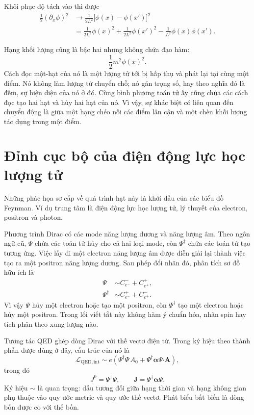 Khôi phục độ tách vào thì được
\begin{align}
\frac12(\partial_x\phi)^2
&\longrightarrow
\frac{1}{2L^2}\bigl[\phi(x)-\phi(x')\bigr]^2
\\
&=
\frac{1}{2L^2}\phi(x)^2
+\frac{1}{2L^2}\phi(x')^2
-\frac{1}{L^2}\phi(x)\phi(x').
\end{align}

Hạng khối lượng cũng là bậc hai nhưng không chứa đạo hàm:
\begin{equation}
\frac12m^2\phi(x)^2.
\end{equation}
Cách đọc một-hạt của nó là một lượng tử tới bị hấp thụ và phát lại tại cùng một điểm. Nó không làm lượng tử chuyển chỗ; nó gán trọng số, hay theo nghĩa đó là đếm, sự hiện diện của nó ở đó. Cùng bình phương toán tử ấy cũng chứa các cách đọc tạo hai hạt và hủy hai hạt của nó. Vì vậy, sự khác biệt có liên quan đến chuyển động là giữa một hạng chéo nối các điểm lân cận và một chèn khối lượng tác dụng trong một điểm.

\section{Đỉnh cục bộ của điện động lực học lượng tử}

Những phác họa sơ cấp về quá trình hạt này là khởi đầu của các biểu đồ Feynman. Ví dụ trung tâm là điện động lực học lượng tử, lý thuyết của electron, positron và photon.

Phương trình Dirac có các mode năng lượng dương và năng lượng âm. Theo ngôn ngữ cũ, \(\Psi\) chứa các toán tử hủy cho cả hai loại mode, còn \(\Psi^\dagger\) chứa các toán tử tạo tương ứng. Việc lấy đi một electron năng lượng âm được diễn giải lại thành việc tạo ra một positron năng lượng dương. Sau phép đổi nhãn đó, phân tích sơ đồ hữu ích là
\begin{align}
\Psi
&\sim
C^-_{e^-}+C^+_{e^+},
\\
\Psi^\dagger
&\sim
C^+_{e^-}+C^-_{e^+}.
\end{align}
Vì vậy \(\Psi\) hủy một electron hoặc tạo một positron, còn \(\Psi^\dagger\) tạo một electron hoặc hủy một positron. Trong lối viết tắt này không hàm ý chuẩn hóa, nhãn spin hay tích phân theo xung lượng nào.

Tương tác QED ghép dòng Dirac với thế vectơ điện từ. Trong ký hiệu theo thành phần được dùng ở đây, cấu trúc của nó là
\begin{equation}
\mathcal L_{\mathrm{QED,int}}
\sim
e\left(
\Psi^\dagger\Psi\,A_0
+
\Psi^\dagger\boldsymbol{\alpha}\Psi\mathbin{\boldsymbol{\cdot}}\mathbf A
\right),
\end{equation}
trong đó
\begin{equation}
J^0=\Psi^\dagger\Psi,
\qquad
\mathbf J=\Psi^\dagger\boldsymbol{\alpha}\Psi.
\end{equation}
Ký hiệu \(\sim\) là quan trọng: dấu tương đối giữa hạng thời gian và hạng không gian phụ thuộc vào quy ước metric và quy ước thế vectơ. Phát biểu bất biến là dòng bốn được co với thế bốn.

